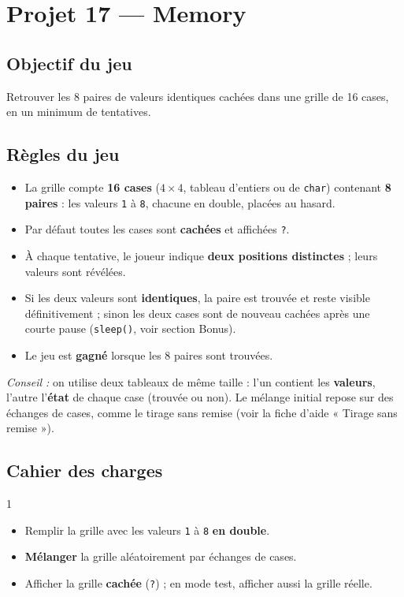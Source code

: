 \section{Projet 17 — Memory}
\setcounter{UPSTInumeroCahier des charges}{0}

\subsection*{Objectif du jeu}
Retrouver les 8 paires de valeurs identiques cachées dans une grille de 16 cases, en un minimum de tentatives.

\subsection*{Règles du jeu}
\begin{itemize}
  \item La grille compte \textbf{16 cases} ($4\times4$, tableau d'entiers ou de \texttt{char}) contenant \textbf{8 paires} : les valeurs \texttt{1} à \texttt{8}, chacune en double, placées au hasard.
  \item Par défaut toutes les cases sont \textbf{cachées} et affichées \texttt{?}.
  \item À chaque tentative, le joueur indique \textbf{deux positions distinctes} ; leurs valeurs sont révélées.
  \item Si les deux valeurs sont \textbf{identiques}, la paire est trouvée et reste visible définitivement ; sinon les deux cases sont de nouveau cachées après une courte pause (\texttt{sleep()}, voir section Bonus).
  \item Le jeu est \textbf{gagné} lorsque les 8 paires sont trouvées.
\end{itemize}

\textit{Conseil :} on utilise deux tableaux de même taille : l'un contient les \textbf{valeurs}, l'autre l'\textbf{état} de chaque case (trouvée ou non). Le mélange initial repose sur des échanges de cases, comme le tirage sans remise (voir la fiche d'aide « Tirage sans remise »).

\subsection*{Cahier des charges}
\begin{UPSTICahierDesCharges}{1}
\begin{itemize}
  \item Remplir la grille avec les valeurs \texttt{1} à \texttt{8} \textbf{en double}.
  \item \textbf{Mélanger} la grille aléatoirement par échanges de cases.
  \item Afficher la grille \textbf{cachée} (\texttt{?}) ; en mode test, afficher aussi la grille réelle.
\end{itemize}
\end{UPSTICahierDesCharges}

